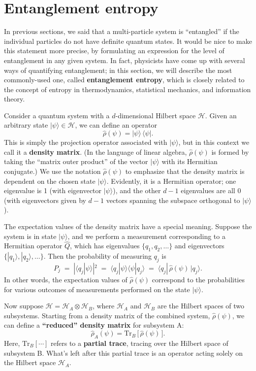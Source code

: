 \documentclass[pra,11pt]{revtex4}
\begin{document}
\section{Entanglement entropy}

In previous sections, we said that a multi-particle system is
``entangled'' if the individual particles do not have definite quantum
states.  It would be nice to make this statement more precise, by
formulating an expression for the level of entanglement in any given
system.  In fact, physicists have come up with several ways of
quantifying entanglement; in this section, we will describe the most
commonly-used one, called \textbf{entanglement entropy}, which is
closely related to the concept of entropy in thermodynamics,
statistical mechanics, and information theory.

Consider a quantum system with a $d$-dimensional Hilbert space
$\mathscr{H}$.  Given an arbitrary state $|\psi\rangle \in
\mathscr{H}$, we can define an operator
$$\hat{\rho}(\psi) = |\psi\rangle\, \langle\psi|.$$
This is simply the projection operator associated with $|\psi\rangle$,
but in this context we call it a \textbf{density matrix}.  (In the
language of linear algebra, $\hat{\rho}(\psi)$ is formed by taking the
``matrix outer product'' of the vector $|\psi\rangle$ with its
Hermitian conjugate.)  We use the notation $\hat{\rho}(\psi)$ to
emphasize that the density matrix is dependent on the chosen state
$|\psi\rangle$.  Evidently, it is a Hermitian operator; one eigenvalue
is 1 (with eigenvector $|\psi\rangle$), and the other $d-1$
eigenvalues are all $0$ (with eigenvectors given by $d-1$ vectors
spanning the subspace orthogonal to $|\psi\rangle$).

The expectation values of the density matrix have a special meaning.
Suppose the system is in state $|\psi\rangle$, and we perform a
measurement corresponding to a Hermitian operator $\hat{Q}$, which has
eigenvalues $\{q_1,q_2,\dots\}$ and eigenvectors
$\{|q_1\rangle,|q_2\rangle,\dots\}$.  Then the probability of
measuring $q_j$ is
$$P_j \;=\; |\langle q_j| \psi\rangle|^2 \;=\; \langle q_j |\psi\rangle \langle \psi|q_j\rangle \;=\; \langle q_j |\, \hat{\rho}(\psi)\, |q_j \rangle.$$
In other words, the expectation values of $\hat{\rho}(\psi)$
correspond to the probabilities for various outcomes of measurements
performed on the state $|\psi\rangle$.

Now suppose $\mathscr{H} = \mathscr{H}_A \otimes \mathscr{H}_B$, where
$\mathscr{H}_A$ and $\mathscr{H}_B$ are the Hilbert spaces of two
subsystems.  Starting from a density matrix of the combined system,
$\hat{\rho}(\psi)$, we can define a \textbf{``reduced'' density
  matrix} for subsystem A:
$$\hat{\rho}_A(\psi) = \mathrm{Tr}_B \,\big[\,\hat{\rho}(\psi)\,\big].$$
Here, $\mathrm{Tr}_B[\cdots]$ refers to a \textbf{partial trace},
tracing over the Hilbert space of subsystem B.  What's left after
this partial trace is an operator acting solely on the Hilbert space
$\mathscr{H}_A$.
\end{document}
